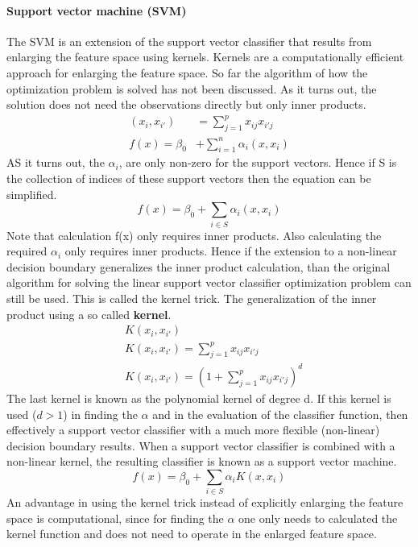 \documentclass[../document.tex]{subfiles}
\begin{document}
	\paragraph{Support vector machine (SVM)}
	The SVM is an extension of the support vector classifier that results from enlarging the feature space using kernels. Kernels are a computationally efficient approach for enlarging the feature space. So far the algorithm of how the optimization problem is solved has not been discussed. As it turns out, the solution does not need the observations directly but only inner products.
	\begin{equation}
	\begin{split}
		(x_{i},x_{i'})&=\sum_{j=1}^{p}x_{ij}x_{i'j}\\
		f(x)=\beta_{0}&+\sum_{i=1}^{n}\alpha_{i}(x,x_{i})
	\end{split}
	\end{equation}
	AS it turns out, the $\alpha_{i}$, are only non-zero for the support vectors. Hence if S is the collection of indices of these support vectors then the equation can be simplified.
	\begin{equation}
		f(x)=\beta_{0}+\sum_{i\in S}\alpha_{i}(x,x_{i})
	\end{equation}
	Note that calculation f(x) only requires inner products. Also calculating the required $\alpha_{i}$ only requires inner products. Hence if the extension to a non-linear decision boundary generalizes the inner product calculation, than the original algorithm for solving the linear support vector classifier optimization problem can still be used. This is called the kernel trick. The generalization of the inner product using a so called \textbf{kernel}.
	\begin{equation}
	\begin{split}
		&K(x_{i},x_{i'})\\
		&K(x_{i},x_{i'})=\sum_{j=1}^{p}x_{ij}x_{i'j}\\
		&K(x_{i},x_{i'})=(1+\sum_{j=1}^{p}x_{ij}x_{i'j})^d
	\end{split}
	\end{equation}
	The last kernel is known as the polynomial kernel of degree d. If this kernel is used ($d>1$) in finding the $\alpha$ and in the evaluation of the classifier function, then effectively a support vector classifier with a much more flexible (non-linear) decision boundary results. When a support vector classifier is combined with a non-linear kernel, the resulting classifier is known as a support vector machine.
	\begin{equation}
		f(x)=\beta_{0}+\sum_{i\in S}\alpha_{i}K(x,x_{i})
	\end{equation}
	An advantage in using the kernel trick instead of explicitly enlarging the feature space is computational, since for finding the $\alpha$ one only needs to calculated the kernel function and does not need to operate in the enlarged feature space.
\end{document}
